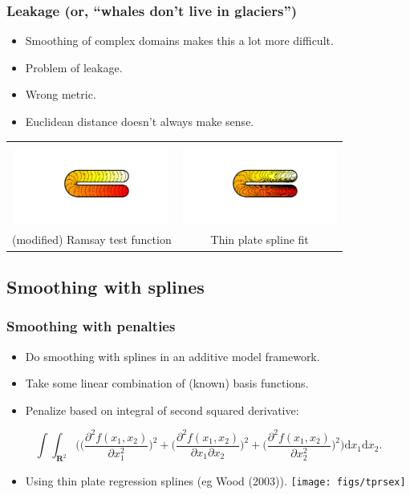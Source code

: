 \documentclass[ignorenonframetext]{beamer} %
\newcommand{\bc}{\begin{center}}
\newcommand{\ec}{\end{center}}
\newcommand{\bi}{\begin{itemize}}
\newcommand{\ei}{\end{itemize}}
\begin{document}
\begin{frame}
	\frametitle{Leakage (or, ``whales don't live in glaciers'')}
       \bi
         \item Smoothing of complex domains makes this a lot more difficult.
         \item Problem of leakage.
         \item Wrong metric.
         \item Euclidean distance doesn't always make sense.
       \ei
       \bc\begin{tabular}{@{}cc}
          & \\
          \includegraphics[width=2in, trim=1in 1in 1in 1in]{figs/ramsayhorseshoe} & \includegraphics[width=2in, trim=1in 1in 1in 1in]{figs/leakageexample}\\
          (modified) Ramsay test function & Thin plate spline fit\\
       \end{tabular}\ec
\end{frame}

\subsection{Smoothing with splines}

\begin{frame}
	\frametitle{Smoothing with penalties}
      \bi
        \item Do smoothing with splines in an additive model framework.
        \item Take some linear combination of (known) basis functions.
        \item Penalize based on integral of second squared derivative:
        \ei
            \begin{equation*}
	            \int\int_{\mathbf{R}^2} \Big( \Big(\frac{\partial^2 f(x_1,x_2)}{\partial x_1^2}\Big)^2 + \Big(\frac{\partial^2 f(x_1,x_2)}{\partial x_1 \partial x_2}\Big)^2 + \Big(\frac{\partial^2 f(x_1,x_2)}{\partial x_2^2}\Big)^2\Big) \text{d}x_1\text{d}x_2.
            \end{equation*}
      \bi
        \item Using thin plate regression splines (eg Wood (2003)).
        \texttt{[image: figs/tprsex]} 
      \ei
\end{frame}
\end{document}
